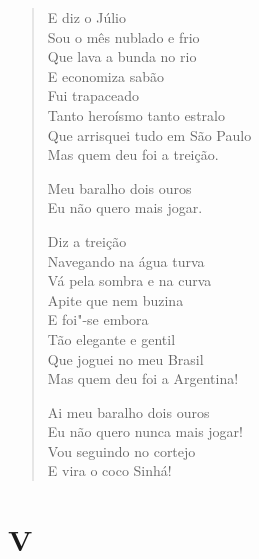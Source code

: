 \begin{verse}
E diz o Júlio\\
Sou o mês nublado e frio\\
Que lava a bunda no rio\\
E economiza sabão\\
Fui trapaceado\\
Tanto heroísmo tanto estralo\\
Que arrisquei tudo em São Paulo\\
Mas quem deu foi a treição.

\quad\quad\quad{}Meu baralho dois ouros\\
\quad\quad\quad{}Eu não quero mais jogar.

Diz a treição\\
Navegando na água turva\\
Vá pela sombra e na curva\\
Apite que nem buzina\\
E foi"-se embora\\
Tão elegante e gentil\\
Que joguei no meu Brasil\\
Mas quem deu foi a Argentina!

\quad\quad\quad{}Ai meu baralho dois ouros\\
\quad\quad{}Eu não quero nunca mais jogar!\\
\quad{}Vou seguindo no cortejo\\
E vira o coco Sinhá!
\end{verse}

\pagebreak
\section*{V}

